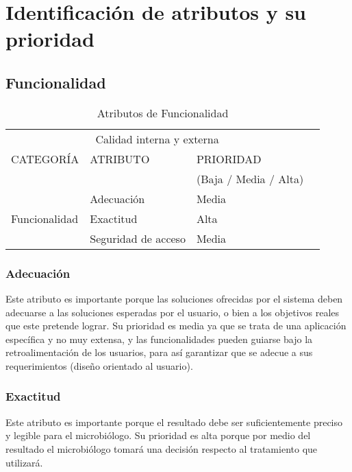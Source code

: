 \documentclass[12pt]{article}
\begin{document}
\section{Identificación de atributos y su prioridad}

\subsection{Funcionalidad}
\vspace*{0.3in}
\begin{table}[htb]%
\centering
\begin{tabular}{|l|l|l|l|}
\hline
\multicolumn{3}{|c|}{Calidad interna y externa   } \\
\cline{1-3}
CATEGORÍA & ATRIBUTO & PRIORIDAD\\ & & (Baja / Media / Alta)\\
\hline \hline
\multirow{3}{3cm}{Funcionalidad} & Adecuación & Media \\ \cline{2-3}
& 
Exactitud &  
Alta\\ \cline{2-3}
& Seguridad de acceso & Media\\ \cline{1-3}
\end{tabular}
\caption{Atributos de Funcionalidad}
\label{tabla:final}
\end{table}%
\subsubsection{Adecuación}
\vspace*{0.2in}
Este atributo es importante porque las soluciones ofrecidas por el sistema deben adecuarse a las soluciones esperadas por el usuario, o bien a los objetivos reales que este pretende lograr. Su prioridad es media ya que se trata de una aplicación específica y no muy extensa, y las funcionalidades pueden guiarse bajo la retroalimentación de los usuarios, para así garantizar que se adecue a sus requerimientos (diseño orientado al usuario).
\subsubsection{Exactitud}
\vspace*{0.2in}
Este atributo es importante porque el resultado debe ser suficientemente preciso y legible para el microbiólogo. Su prioridad es alta porque por medio del resultado el microbiólogo tomará una decisión respecto al tratamiento que utilizará.
\end{document}
